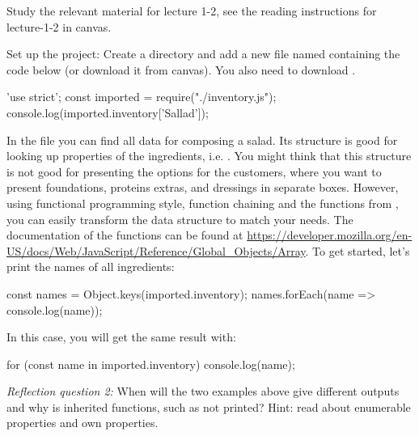\documentclass[fleqn, article, a4paper]{memoir}
\begin{document}
\begin{Assignments}

\item Study the relevant material for lecture 1-2, see the reading instructions for lecture-1-2 in canvas. 


\item %
Set up the project: Create a directory and add a new file named  containing the code below (or download it from canvas). You also need to download .
\begin{Code}
'use strict';
const imported = require("./inventory.js");
console.log(imported.inventory['Sallad']);
\end{Code}



\item In the  file you can find all data for composing a salad. Its structure is good for looking up properties of the ingredients, i.e. . You might think that this structure is not good for presenting the options for the customers, where you want to present foundations, proteins extras, and dressings in separate boxes. However, using functional programming style, function chaining and the functions from , you can easily transform the data structure to match your needs. The documentation of the functions can be found at \url{https://developer.mozilla.org/en-US/docs/Web/JavaScript/Reference/Global_Objects/Array}. To get started, let's print the names of all ingredients:
\begin{Code}
const names = Object.keys(imported.inventory);
names.forEach(name => console.log(name));
\end{Code}
In this case, you will get the same result with:
\begin{Code}
for (const name in imported.inventory) {
  console.log(name);
}
\end{Code}
\emph{Reflection question 2:} When will the two examples above give different outputs and why is inherited functions, such as  not printed? Hint: read about enumerable properties and own properties.


\end{Assignments}
\end{document}
